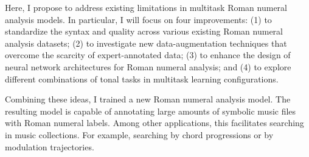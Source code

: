 Here, I propose to address existing limitations in multitask
Roman numeral analysis models. In particular, I will focus
on four improvements: (1) to standardize the syntax and
quality across various existing Roman numeral analysis
datasets; (2) to investigate new data-augmentation
techniques that overcome the scarcity of expert-annotated
data; (3) to enhance the design of neural network
architectures for Roman numeral analysis; and (4) to explore
different combinations of tonal tasks in multitask learning
configurations.

Combining these ideas, I trained a new Roman numeral
analysis model. The resulting model is capable of annotating
large amounts of symbolic music files with Roman numeral
labels. Among other applications, this facilitates searching
in music collections. For example, searching by chord
progressions or by modulation trajectories.
